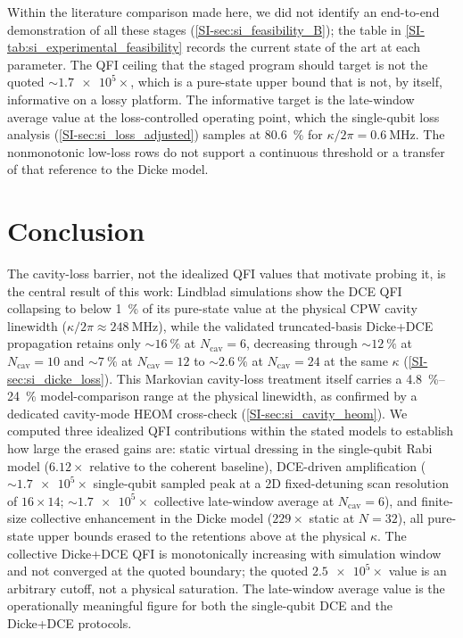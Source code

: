 \documentclass[aps,prxquantum,preprint,superscriptaddress,amsmath,amssymb]{revtex4-2}
\begin{document}
Within the literature comparison made here, we did not identify an end-to-end demonstration of all these stages (\cref{SI-sec:si_feasibility_B}); the table in \cref{SI-tab:si_experimental_feasibility} records the current state of the art at each parameter. The QFI ceiling that the staged program should target is not the quoted $\sim\num{1.7e5}\times$, which is a pure-state upper bound that is not, by itself, informative on a lossy platform. The informative target is the late-window average value at the loss-controlled operating point, which the single-qubit loss analysis (\cref{SI-sec:si_loss_adjusted}) samples at \qty{80.6}{\percent} for $\kappa/2\pi=\qty{0.6}{\mega\hertz}$. The nonmonotonic low-loss rows do not support a continuous threshold or a transfer of that reference to the Dicke model.

\section{Conclusion}
\label{sec:conclusion}

The cavity-loss barrier, not the idealized QFI values that motivate probing it, is the central result of this work: Lindblad simulations show the DCE QFI collapsing to below \qty{1}{\percent} of its pure-state value at the physical CPW cavity linewidth ($\kappa/2\pi \approx \qty{248}{\mega\hertz}$), while the validated truncated-basis Dicke+DCE propagation retains only $\sim\qty{16}{\percent}$ at $N_{\text{cav}}=\num{6}$, decreasing through $\sim\qty{12}{\percent}$ at $N_{\text{cav}}=\num{10}$ and $\sim\qty{7}{\percent}$ at $N_{\text{cav}}=\num{12}$ to $\sim\qty{2.6}{\percent}$ at $N_{\text{cav}}=\num{24}$ at the same $\kappa$ (\cref{SI-sec:si_dicke_loss}). This Markovian cavity-loss treatment itself carries a \qty{4.8}{\percent}--\qty{24}{\percent} model-comparison range at the physical linewidth, as confirmed by a dedicated cavity-mode HEOM cross-check (\cref{SI-sec:si_cavity_heom}). We computed three idealized QFI contributions within the stated models to establish how large the erased gains are: static virtual dressing in the single-qubit Rabi model ($\num{6.12}\times$ relative to the coherent baseline), DCE-driven amplification ($\sim\!\num{1.7e5}\times$ single-qubit sampled peak at a \num{2}D fixed-detuning scan resolution of $16\times14$; $\sim\!\num{1.7e5}\times$ collective late-window average at $N_{\text{cav}}=\num{6}$), and finite-size collective enhancement in the Dicke model ($\num{229}\times$ static at $N = \num{32}$), all pure-state upper bounds erased to the retentions above at the physical $\kappa$. The collective Dicke+DCE QFI is monotonically increasing with simulation window and not converged at the quoted boundary; the quoted $\num{2.5e5}\times$ value is an arbitrary cutoff, not a physical saturation. The late-window average value is the operationally meaningful figure for both the single-qubit DCE and the Dicke+DCE protocols.
\end{document}
